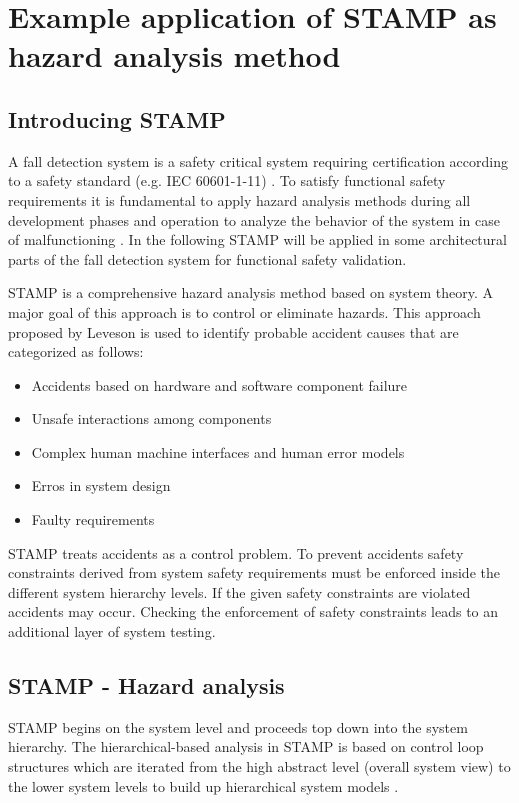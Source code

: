 \documentclass[10pt,journal,compsoc]{IEEEtran}
\begin{document}
\section{Example application of STAMP as hazard analysis method}
\label{sec:STAMP}

\subsection{Introducing STAMP}
A fall detection system is a safety critical system requiring certification according to a safety standard (e.g. IEC 60601-1-11) \cite{international2005medical}. To satisfy functional safety requirements it is fundamental to apply hazard analysis methods during all development phases and operation to analyze the behavior of the system in case of malfunctioning \cite{STAMPThesis}. In the following STAMP will be applied in some architectural parts of the fall detection system for functional safety validation.

STAMP is a comprehensive hazard analysis method based on system theory. A major goal of this approach is to control or eliminate hazards. This approach proposed by Leveson \cite{leveson2011engineering} is used to identify probable accident causes that are categorized as follows:
\begin{itemize}
	\item Accidents based on hardware and software component failure
	\item Unsafe interactions among components
	\item Complex human machine interfaces and human error models
	\item Erros in system design
	\item Faulty requirements
\end{itemize}  
STAMP treats accidents as a control problem. To prevent accidents safety constraints derived from system safety requirements must be enforced inside the different system hierarchy levels. If the given safety constraints are violated accidents may occur. Checking the enforcement of safety constraints leads to an additional layer of system testing. 

\subsection{STAMP - Hazard analysis}
STAMP begins on the system level and proceeds top down into the system hierarchy. The hierarchical-based analysis in STAMP is based on control loop structures which are iterated from the high abstract level (overall system view) to the lower system levels to build up hierarchical system models \cite{leveson2011engineering}. 
\end{document}
